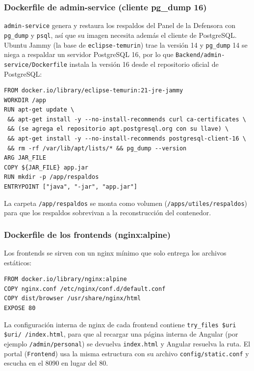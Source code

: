 \subsubsection{Dockerfile de admin-service (cliente pg\_dump 16)}
\texttt{admin-service} genera y restaura los respaldos del Panel de la Defensora con \texttt{pg\_dump} y \texttt{psql}, así que su imagen necesita además el cliente de PostgreSQL. Ubuntu Jammy (la base de \texttt{eclipse-temurin}) trae la versión 14 y \texttt{pg\_dump} 14 se niega a respaldar un servidor PostgreSQL 16, por lo que \texttt{Backend/admin-service/Dockerfile} instala la versión 16 desde el repositorio oficial de PostgreSQL:
\begin{lstlisting}
FROM docker.io/library/eclipse-temurin:21-jre-jammy
WORKDIR /app
RUN apt-get update \
 && apt-get install -y --no-install-recommends curl ca-certificates \
 && (se agrega el repositorio apt.postgresql.org con su llave) \
 && apt-get install -y --no-install-recommends postgresql-client-16 \
 && rm -rf /var/lib/apt/lists/* && pg_dump --version
ARG JAR_FILE
COPY ${JAR_FILE} app.jar
RUN mkdir -p /app/respaldos
ENTRYPOINT ["java", "-jar", "app.jar"]
\end{lstlisting}
La carpeta \texttt{/app/respaldos} se monta como volumen (\nolinkurl{/apps/utiles/respaldos}) para que los respaldos sobrevivan a la reconstrucción del contenedor.

\subsubsection{Dockerfile de los frontends (nginx:alpine)}
Los frontends se sirven con un nginx mínimo que solo entrega los archivos estáticos:
\begin{lstlisting}
FROM docker.io/library/nginx:alpine
COPY nginx.conf /etc/nginx/conf.d/default.conf
COPY dist/browser /usr/share/nginx/html
EXPOSE 80
\end{lstlisting}
La configuración interna de nginx de cada frontend contiene \texttt{try\_files \$uri \$uri/ /index.html}, para que al recargar una página interna de Angular (por ejemplo \texttt{/admin/personal}) se devuelva \texttt{index.html} y Angular resuelva la ruta. El portal (\texttt{Frontend}) usa la misma estructura con su archivo \texttt{config/static.conf} y escucha en el 8090 en lugar del 80.



